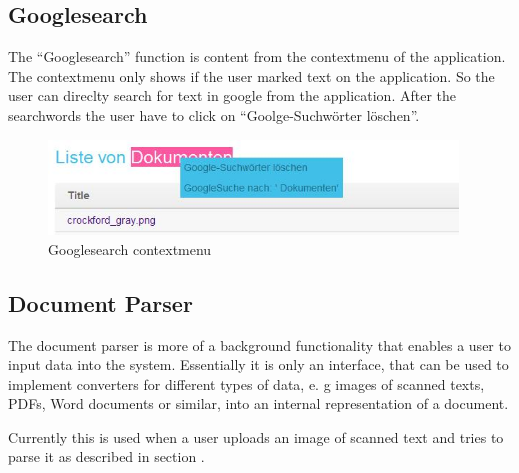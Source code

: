 \subsection{Googlesearch}

The \enquote{Googlesearch} function is content from the contextmenu of the application. The contextmenu only shows if 
the user marked text on the application. So the user can direclty search for text in google from the application. After 
the searchwords the user have to click on \enquote{Goolge-Suchwörter löschen}.

\begin{figure}[!ht]
  \centering
    \includegraphics[width=0.97\textwidth]{images/basic_functionalities/contextmenu.jpg}
  \caption{Googlesearch contextmenu}
  \label{fig:contextmenu}
\end{figure}

\subsection{Document Parser}

The document parser is more of a background functionality that enables a user to input data into the system. 
Essentially it is only an interface, that can be used to implement converters for different types of data, e. g images 
of scanned texts, PDFs, Word documents 
or similar, into an internal representation of a 
document.  

Currently this is used when a user uploads an image of scanned text and tries to parse it as described in section 
.
